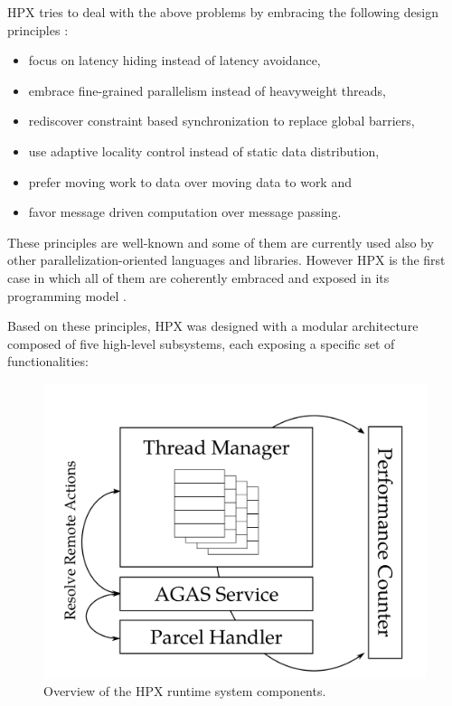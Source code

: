 HPX tries to deal with the above problems by embracing the following design principles \cite{kaiser2014hpx}:
\begin{itemize}
	\item focus on latency hiding instead of latency avoidance,
	\item embrace fine-grained parallelism instead of heavyweight threads,
	\item rediscover constraint based synchronization to replace global barriers,
	\item use adaptive locality control instead of static data distribution, 
	\item prefer moving work to data over moving data to work and 
	\item favor message driven computation over message passing.
\end{itemize}
These principles are well-known and some of them are currently used also by other parallelization-oriented languages and libraries. However HPX is the first case in which all of them are coherently embraced and exposed in its programming model \cite{kaiser2014hpx}.

Based on these principles, HPX was designed with a modular architecture composed of five high-level subsystems, each exposing a specific set of functionalities:

\begin{figure}[b]
 	\begin{center}
 		\includegraphics[scale=0.18]{Figures/hpxArchitecture.png}
 		\caption{Overview of the HPX runtime system components\cite{heller2017hpx}.}\label{fig:hpxArchitecture}
 	\end{center}
\end{figure}
~\\~

